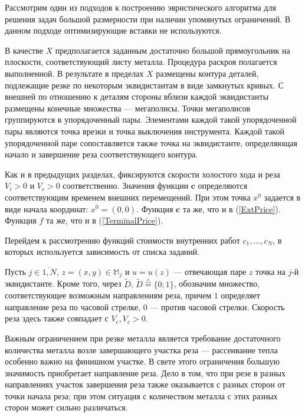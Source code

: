 \documentclass[11pt,twoside,openany]{report}
\begin{document}
{{Рассмотрим один из подходов к построению эвристического алгоритма для решения
задач большой размерности при наличии упомянутых ограничений. В данном подходе
оптимизирующие вставки не используются.

В качестве $X$ предполагается заданным достаточно большой прямоугольник
на плоскости, соответствующий листу металла. Процедура раскроя полагается
выполненной. В результате в пределах $X$ размещены контура деталей,
подлежащие резке по некоторым эквидистантам в виде замкнутых кривых.
С внешней по отношению к деталям стороны вблизи каждой эквидистанты
размещены конечные множества --- мегаполисы. Точки мегаполисов группируются
в упорядоченный пары. Элементами каждой такой упорядоченной пары являются точка
врезки и точка выключения инструмента. Каждой такой упорядоченной паре
сопоставляется также точка на эквидистанте, определяющая начало и завершение
реза соответствующего контура.

Как и в предыдущих разделах, фиксируются скорости холостого хода
и реза $V_i>0$ и $V_c>0$ соответственно. Значения функции $\mathbf{c}$
определяются соответствующим временем внешних перемещений. При этом точка
$x^0$ задается в виде начала координат: $x^0=(0,0)$. Функция $\mathbf{c}$
та же, что и в (\ref{ExtPrice}). Функция $f$ та же, что и в
(\ref{TerminalPrice}).

Перейдем к рассмотрению функций стоимости внутренних работ $c_1,...,c_N$,
в которых используется зависимость от списка заданий.

Пусть $j\in \overline{1,N}$, $z=(x,y)\in \mathbb{M}_j$ и
$u=u(z)$ --- отвечающая паре $z$ точка на $j$-й эквидистанте.
Кроме того, через $\tilde{D}$, $\tilde{D}\stackrel{\triangle}{=}\{0;1\}$,
обозначим множество, соответствующее возможным направлениям реза, причем $1$
определяет направление реза по часовой стрелке, $0$ --- против
часовой стрелки. Скорость реза здесь также совпадает с $V_c, V_c>0$.

Важным ограничением при резке металла является требование достаточного
количества металла возле завершающего участка реза --- рассеивание тепла
особенно важно на финишном участке.
В свете этого ограничения большую значимость приобретает направление реза.
Дело в том, что при резе в разных направлениях участок завершения реза
также оказывается с разных сторон от точки начала реза; при этом ситуация
с количеством металла с этих разных сторон может сильно различаться.

}}
\end{document}
